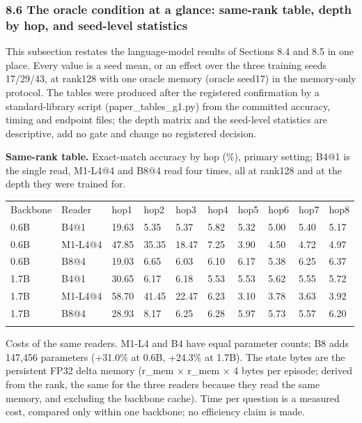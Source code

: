 \subsubsection*{8.6 The oracle condition at a glance: same-rank table, depth by hop, and seed-level statistics}

This subsection restates the language-model results of Sections 8.4 and 8.5 in one place. Every value is a seed mean, or an
effect over the three training seeds 17/\allowbreak{}29/\allowbreak{}43, at rank128 with one oracle memory (oracle seed17) in the memory-only protocol. The
tables were produced after the registered confirmation by a standard-library script
(paper\_tables\_g1.py) from the committed accuracy, timing and endpoint files; the depth matrix and the
seed-level statistics are descriptive, add no gate and change no registered decision.  %

\textbf{Same-rank table.} Exact-match accuracy by hop (\%), primary setting; B4@1 is the single read, M1-L4@4 and B8@4 read four times, all at
rank128 and at the depth they were trained for.  %


{\footnotesize
\setlength{\tabcolsep}{3pt}
\begin{longtable}{W{100}{20}W{100}{20}W{100}{20}W{100}{20}W{100}{20}W{100}{20}W{100}{20}W{100}{20}W{100}{20}W{100}{20}}
\toprule
Backbone & Reader & hop1 & hop2 & hop3 & hop4 & hop5 & hop6 & hop7 & hop8 \\ \addlinespace[3pt]
\midrule \endhead
0.6B & B4@1 & 19.63 & 5.35 & 5.37 & 5.82 & 5.32 & 5.00 & 5.40 & 5.17 \\ \addlinespace[3pt]
0.6B & M1-L4@4 & 47.85 & 35.35 & 18.47 & 7.25 & 3.90 & 4.50 & 4.72 & 4.97 \\ \addlinespace[3pt]
0.6B & B8@4 & 19.03 & 6.65 & 6.03 & 6.10 & 6.17 & 5.38 & 6.25 & 6.37 \\ \addlinespace[3pt]
1.7B & B4@1 & 30.65 & 6.17 & 6.18 & 5.53 & 5.53 & 5.62 & 5.55 & 5.72 \\ \addlinespace[3pt]
1.7B & M1-L4@4 & 58.70 & 41.45 & 22.47 & 6.23 & 3.10 & 3.78 & 3.63 & 3.92 \\ \addlinespace[3pt]
1.7B & B8@4 & 28.93 & 8.17 & 6.25 & 6.28 & 5.97 & 5.73 & 5.57 & 6.20 \\ \addlinespace[3pt]
\bottomrule
\end{longtable}
}


Costs of the same readers. M1-L4 and B4 have equal parameter counts; B8 adds 147,456 parameters (+31.0\% at 0.6B, +24.3\% at 1.7B). The state
bytes are the persistent FP32 delta memory (r\_mem \ensuremath{\times} r\_mem \ensuremath{\times} 4 bytes per episode; derived from the rank, the same for the three readers because
they read the same memory, and excluding the backbone cache). Time per question is a measured cost, compared only within one backbone; no
efficiency claim is made.  %


